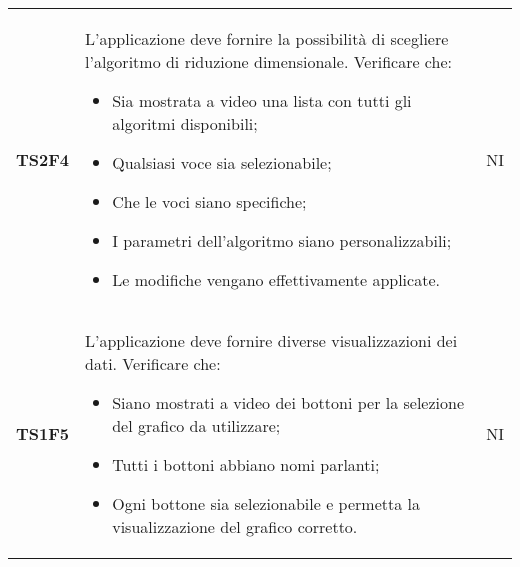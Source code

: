 \begin{longtable}{C{2cm} C{12cm} C{1.5cm}}
\textbf{TS2F4} &  L'applicazione deve fornire la possibilità di scegliere l'algoritmo di riduzione dimensionale. Verificare che: 
					\begin{itemize}
						\item Sia mostrata a video una lista con tutti gli algoritmi disponibili;			   
						\item Qualsiasi voce sia selezionabile;
						\item Che le voci siano specifiche;
						\item I parametri dell'algoritmo siano personalizzabili;
						\item Le modifiche vengano effettivamente applicate.
					\end{itemize}
			   &  NI \\

\textbf{TS1F5} &  L'applicazione deve fornire diverse visualizzazioni dei dati. Verificare che: 
					\begin{itemize}
						\item Siano mostrati a video dei bottoni per la selezione del grafico da utilizzare;
						\item Tutti i bottoni abbiano nomi parlanti;
						\item Ogni bottone sia selezionabile e permetta la visualizzazione del grafico corretto.
					\end{itemize}
			   &  NI \\
			   

\end{longtable}
